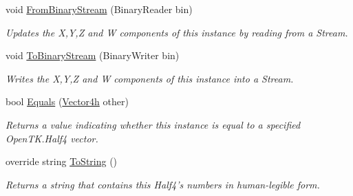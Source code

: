\begin{DoxyCompactItemize}
void \hyperlink{struct_open_t_k_1_1_vector4h_adb350cc08415f8b638b387d3a287a7de}{From\-Binary\-Stream} (Binary\-Reader bin)
\begin{DoxyCompactList}\small\item\em Updates the X,Y,Z and W components of this instance by reading from a Stream.\end{DoxyCompactList}\item 
void \hyperlink{struct_open_t_k_1_1_vector4h_a399cff7f70db09a64e955f61a8b29cd2}{To\-Binary\-Stream} (Binary\-Writer bin)
\begin{DoxyCompactList}\small\item\em Writes the X,Y,Z and W components of this instance into a Stream.\end{DoxyCompactList}\item 
bool \hyperlink{struct_open_t_k_1_1_vector4h_af0c8cc38d1f30366328065bdfcb71cc4}{Equals} (\hyperlink{struct_open_t_k_1_1_vector4h}{Vector4h} other)
\begin{DoxyCompactList}\small\item\em Returns a value indicating whether this instance is equal to a specified Open\-T\-K.\-Half4 vector.\end{DoxyCompactList}\item 
override string \hyperlink{struct_open_t_k_1_1_vector4h_ae4a53dc818c978924405f9c98c78672f}{To\-String} ()
\begin{DoxyCompactList}\small\item\em Returns a string that contains this Half4's numbers in human-\/legible form.\end{DoxyCompactList}\end{DoxyCompactItemize}
